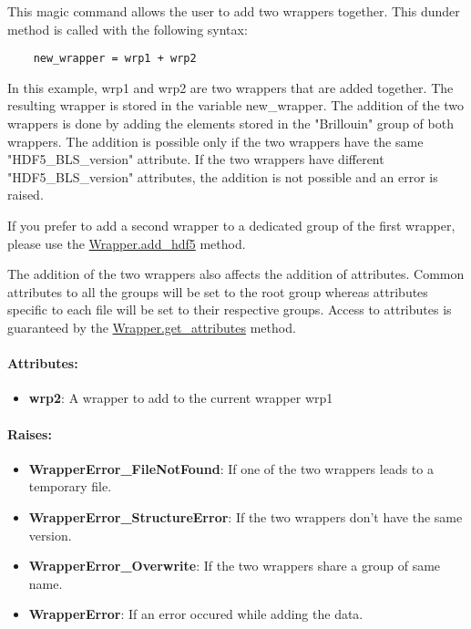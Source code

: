 This magic command allows the user to add two wrappers together. This dunder method is called with the following syntax:
\begin{lstlisting}
    new_wrapper = wrp1 + wrp2
\end{lstlisting}

In this example, wrp1 and wrp2 are two wrappers that are added together. The resulting wrapper is stored in the variable new\_wrapper. The addition of the two wrappers is done by adding the elements stored in the "Brillouin" group of both wrappers. The addition is possible only if the two wrappers have the same "HDF5\_BLS\_version" attribute. If the two wrappers have different "HDF5\_BLS\_version" attributes, the addition is not possible and an error is raised.

If you prefer to add a second wrapper to a dedicated group of the first wrapper, please use the \hyperref[subchapter:wrapper.add_hdf5]{Wrapper.add\_hdf5} method.

The addition of the two wrappers also affects the addition of attributes. Common attributes to all the groups will be set to the root group whereas attributes specific to each file will be set to their respective groups. Access to attributes is guaranteed by the \hyperref[subchapter:wrapper.get_attributes]{Wrapper.get\_attributes} method.

\paragraph{Attributes:}

\begin{itemize}
    \item \textbf{wrp2}: A wrapper to add to the current wrapper wrp1
\end{itemize}

\paragraph{Raises:}

\begin{itemize}
    \item \textbf{WrapperError\_FileNotFound}: If one of the two wrappers leads to a temporary file.
    \item \textbf{WrapperError\_StructureError}: If the two wrappers don't have the same version.
    \item \textbf{WrapperError\_Overwrite}: If the two wrappers share a group of same name.
    \item \textbf{WrapperError}: If an error occured while adding the data.
\end{itemize}

